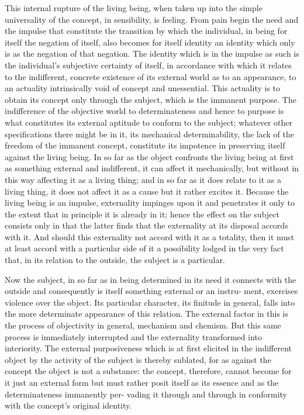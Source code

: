 This internal rupture of the living being, when taken up into the simple
universality of the concept, in sensibility, is feeling. From pain begin the
need and the impulse that constitute the transition by which the individual,
in being for itself the negation of itself, also becomes for itself identity
 an
identity which only is as the negation of that negation.
 The identity which
is in the impulse as such is the individual's subjective certainty of itself,
in accordance with which it relates to the indifferent, concrete existence
of its external world as to an appearance, to an actuality intrinsically void
of concept and unessential. This actuality is to obtain its concept only
through the subject, which is the immanent purpose. The indifference
of the objective world to determinateness and hence to purpose is what
constitutes its external aptitude to conform to the subject; whatever other
specifications there might be in it, its mechanical determinability, the lack
of the freedom of the immanent concept, constitute its impotence in
preserving itself against the living being.
 In so far as the object confronts
the living being at first as something external and indifferent, it can affect
it mechanically, but without in this way affecting it as a living thing; and
in so far as it does relate to it as a living thing, it does not affect it as a cause
but it rather excites it. Because the living being is an impulse, externality
impinges upon it and penetrates it only to the extent that in principle it
is already in it; hence the effect on the subject consists only in that the
latter finds that the externality at its disposal accords with it. And should
this externality not accord with it as a totality, then it must at least accord
with a particular side of it
 a possibility lodged in the very fact that, in its
relation to the outside, the subject is a particular.

Now the subject, in so far as in being determined in its need it connects
with the outside and consequently is itself something external or an instru-
ment, exercises violence over the object. Its particular character, its finitude
in general, falls into the more determinate appearance of this relation.
 The
external factor in this is the process of objectivity in general, mechanism
and chemism. But this same process is immediately interrupted and the
externality transformed into interiority. The external purposiveness which
is at first elicited in the indifferent object by the activity of the subject is
thereby sublated, for as against the concept the object is not a substance:
the concept, therefore, cannot become for it just an external form but must
rather posit itself as its essence and as the determinateness immanently per-
vading it through and through in conformity with the concept's original
identity.

